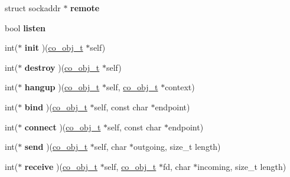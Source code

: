 \begin{DoxyCompactItemize}
\item 
\hypertarget{structco__socket__t_a19c78414f1bbd51f1d20627df6324db0}{struct sockaddr $\ast$ {\bfseries remote}}\label{structco__socket__t_a19c78414f1bbd51f1d20627df6324db0}

\item 
\hypertarget{structco__socket__t_a6560f74760929fd42d7e591da9404a36}{bool {\bfseries listen}}\label{structco__socket__t_a6560f74760929fd42d7e591da9404a36}

\item 
\hypertarget{structco__socket__t_a48ecad61f3b3595671545c8af8a727c1}{int($\ast$ {\bfseries init} )(\hyperlink{structco__obj__t}{co\+\_\+obj\+\_\+t} $\ast$self)}\label{structco__socket__t_a48ecad61f3b3595671545c8af8a727c1}

\item 
\hypertarget{structco__socket__t_a1c9bd51906559c2875900bc4918d90c4}{int($\ast$ {\bfseries destroy} )(\hyperlink{structco__obj__t}{co\+\_\+obj\+\_\+t} $\ast$self)}\label{structco__socket__t_a1c9bd51906559c2875900bc4918d90c4}

\item 
\hypertarget{structco__socket__t_ae4c1935afe6427418d2317f6af5baf63}{int($\ast$ {\bfseries hangup} )(\hyperlink{structco__obj__t}{co\+\_\+obj\+\_\+t} $\ast$self, \hyperlink{structco__obj__t}{co\+\_\+obj\+\_\+t} $\ast$context)}\label{structco__socket__t_ae4c1935afe6427418d2317f6af5baf63}

\item 
\hypertarget{structco__socket__t_a0b9945acdc194385674bd97cc93ab649}{int($\ast$ {\bfseries bind} )(\hyperlink{structco__obj__t}{co\+\_\+obj\+\_\+t} $\ast$self, const char $\ast$endpoint)}\label{structco__socket__t_a0b9945acdc194385674bd97cc93ab649}

\item 
\hypertarget{structco__socket__t_a8e8cf38911114c3695971adecfe0fb4a}{int($\ast$ {\bfseries connect} )(\hyperlink{structco__obj__t}{co\+\_\+obj\+\_\+t} $\ast$self, const char $\ast$endpoint)}\label{structco__socket__t_a8e8cf38911114c3695971adecfe0fb4a}

\item 
\hypertarget{structco__socket__t_ace5ee4d250ce5a73ed8b46ff769c075c}{int($\ast$ {\bfseries send} )(\hyperlink{structco__obj__t}{co\+\_\+obj\+\_\+t} $\ast$self, char $\ast$outgoing, size\+\_\+t length)}\label{structco__socket__t_ace5ee4d250ce5a73ed8b46ff769c075c}

\item 
\hypertarget{structco__socket__t_a0a0a266d5900a65047fea3f28892657a}{int($\ast$ {\bfseries receive} )(\hyperlink{structco__obj__t}{co\+\_\+obj\+\_\+t} $\ast$self, \hyperlink{structco__obj__t}{co\+\_\+obj\+\_\+t} $\ast$fd, char $\ast$incoming, size\+\_\+t length)}\label{structco__socket__t_a0a0a266d5900a65047fea3f28892657a}


\end{DoxyCompactItemize}
